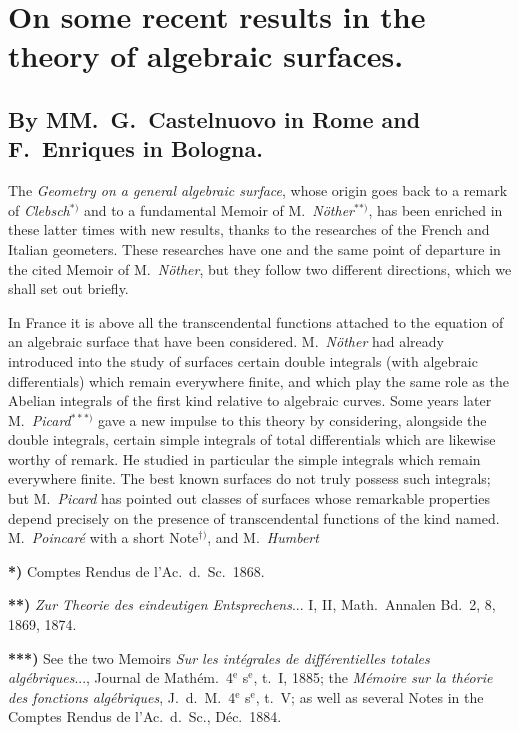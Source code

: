 \documentclass{article}
\begin{document}

\section*{On some recent results in the theory of algebraic surfaces.}

\subsection*{By MM.\ G.\ Castelnuovo in Rome and F.\ Enriques in Bologna.}

The \emph{Geometry on a general algebraic surface}, whose origin goes back to a remark of \emph{Clebsch}${}^{*)}$ and to a fundamental Memoir of M.\ \emph{Nöther}${}^{**)}$, has been enriched in these latter times with new results, thanks to the researches of the French and Italian geometers. These researches have one and the same point of departure in the cited Memoir of M.\ \emph{Nöther}, but they follow two different directions, which we shall set out briefly.

In France it is above all the transcendental functions attached to the equation of an algebraic surface that have been considered. M.\ \emph{Nöther} had already introduced into the study of surfaces certain double integrals (with algebraic differentials) which remain everywhere finite, and which play the same role as the Abelian integrals of the first kind relative to algebraic curves. Some years later M.\ \emph{Picard}${}^{***)}$ gave a new impulse to this theory by considering, alongside the double integrals, certain simple integrals of total differentials which are likewise worthy of remark. He studied in particular the simple integrals which remain everywhere finite. The best known surfaces do not truly possess such integrals; but M.\ \emph{Picard} has pointed out classes of surfaces whose remarkable properties depend precisely on the presence of transcendental functions of the kind named. M.\ \emph{Poincaré} with a short Note${}^{\dagger)}$, and M.\ \emph{Humbert}

\textbf{*)} Comptes Rendus de l'Ac.\ d.\ Sc.\ 1868.

\textbf{**)} \emph{Zur Theorie des eindeutigen Entsprechens}... I, II, Math.\ Annalen Bd.\ 2, 8, 1869, 1874.

\textbf{***)} See the two Memoirs \emph{Sur les intégrales de différentielles totales algébriques}..., Journal de Mathém.\ 4${}^{\text{e}}$ s${}^{\text{e}}$, t.\ I, 1885; the \emph{Mémoire sur la théorie des fonctions algébriques}, J.\ d.\ M.\ 4${}^{\text{e}}$ s${}^{\text{e}}$, t.\ V; as well as several Notes in the Comptes Rendus de l'Ac.\ d.\ Sc., Déc.\ 1884.
\end{document}

